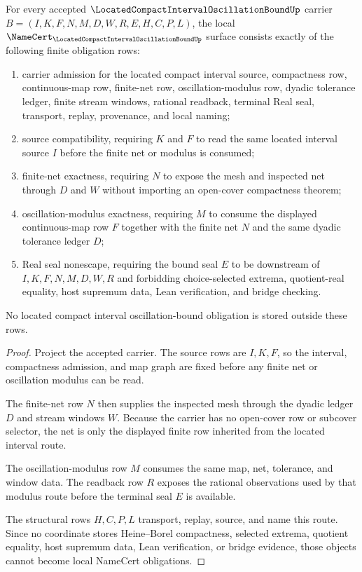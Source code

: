 \begin{theorem}
\label{thm:located-compact-interval-oscillation-bound-namecert-obligations}
For every accepted $\LocatedCompactIntervalOscillationBoundUp$ carrier $B=(I,K,F,N,M,D,W,R,E,H,C,P,L)$, the local $\NameCert_{\LocatedCompactIntervalOscillationBoundUp}$ surface consists exactly of the following finite obligation rows:
\begin{enumerate}
\item carrier admission for the located compact interval source, compactness row, continuous-map row, finite-net row, oscillation-modulus row, dyadic tolerance ledger, finite stream windows, rational readback, terminal Real seal, transport, replay, provenance, and local naming;
\item source compatibility, requiring $K$ and $F$ to read the same located interval source $I$ before the finite net or modulus is consumed;
\item finite-net exactness, requiring $N$ to expose the mesh and inspected net through $D$ and $W$ without importing an open-cover compactness theorem;
\item oscillation-modulus exactness, requiring $M$ to consume the displayed continuous-map row $F$ together with the finite net $N$ and the same dyadic tolerance ledger $D$;
\item Real seal nonescape, requiring the bound seal $E$ to be downstream of $I,K,F,N,M,D,W,R$ and forbidding choice-selected extrema, quotient-real equality, host supremum data, Lean verification, and bridge checking.
\end{enumerate}
No located compact interval oscillation-bound obligation is stored outside these rows.
\end{theorem}
\begin{proof}
Project the accepted carrier. The source rows are $I,K,F$, so the interval, compactness admission, and map graph are fixed before any finite net or oscillation modulus can be read.

The finite-net row $N$ then supplies the inspected mesh through the dyadic ledger $D$ and stream windows $W$. Because the carrier has no open-cover row or subcover selector, the net is only the displayed finite row inherited from the located interval route.

The oscillation-modulus row $M$ consumes the same map, net, tolerance, and window data. The readback row $R$ exposes the rational observations used by that modulus route before the terminal seal $E$ is available.

The structural rows $H,C,P,L$ transport, replay, source, and name this route. Since no coordinate stores Heine--Borel compactness, selected extrema, quotient equality, host supremum data, Lean verification, or bridge evidence, those objects cannot become local NameCert obligations.
\end{proof}

